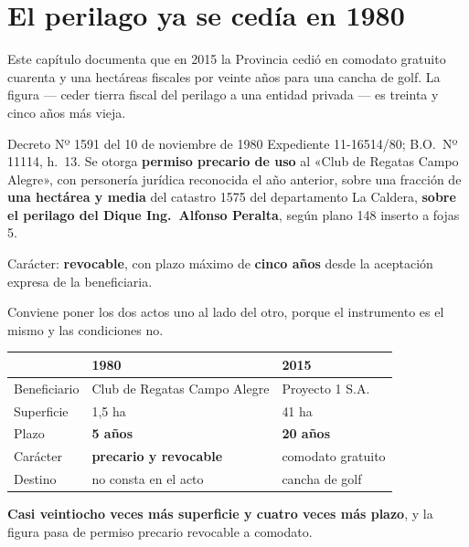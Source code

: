 \section{El perilago ya se cedía en 1980}

Este capítulo documenta que en 2015 la Provincia cedió en comodato gratuito cuarenta y una
hectáreas fiscales por veinte años para una cancha de golf. La figura --- ceder tierra fiscal
del perilago a una entidad privada --- es treinta y cinco años más vieja.

\begin{ficha}{Decreto Nº 1591 del 10 de noviembre de 1980}
Expediente 11-16514/80; B.O.\ Nº 11114, h.\ 13. Se otorga \textbf{permiso precario de uso} al «Club de Regatas Campo
Alegre», con personería jurídica reconocida el año anterior, sobre una fracción de
\textbf{una hectárea y media} del catastro 1575 del departamento La Caldera, \textbf{sobre el
perilago del Dique Ing.\ Alfonso Peralta}, según plano 148 inserto a fojas 5.

Carácter: \textbf{revocable}, con plazo máximo de \textbf{cinco años} desde la aceptación
expresa de la beneficiaria.
\end{ficha}

Conviene poner los dos actos uno al lado del otro, porque el instrumento es el mismo y las
condiciones no.

{\small
\begin{longtable}{@{}p{3.0cm}p{4.6cm}p{4.6cm}@{}}
\toprule
 & \textbf{1980} & \textbf{2015} \\
\midrule
\endhead
Beneficiario & Club de Regatas Campo Alegre & Proyecto 1 S.A. \\
Superficie & 1,5 ha & 41 ha \\
Plazo & \textbf{5 años} & \textbf{20 años} \\
Carácter & \textbf{precario y revocable} & comodato gratuito \\
Destino & no consta en el acto & cancha de golf \\
\bottomrule
\end{longtable}
}

\textbf{Casi veintiocho veces más superficie y cuatro veces más plazo}, y la figura pasa de
permiso precario revocable a comodato.

